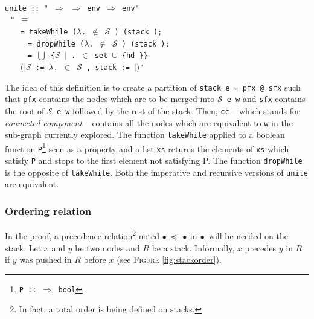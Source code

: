 \documentclass[a4 paper, 12pt]{article}
\newcommand{\where}{{\color{isa_green}{where}}}
\newcommand{\generic}[1]{{\color{isa_purple}{\textquotesingle#1}}}
\newcommand{\isa}[1]{\small\texttt{\\\noindent#1}}
\newcommand{\blue}[1]{{\color{isa_dark_blue}{#1}}}
\newcommand{\bblue}[1]{{\color{isa_blue}{#1}}}
\newcommand{\green}[1]{{\color{isa_dark_green}{#1}}}
\newcommand{\env}[1]{$(\!|$#1$|\!)$}
\theoremstyle{definition}
\begin{document}
\isa{
    \bblue{definition} unite :: "\generic{v} $\Rightarrow$ \generic{v} $\Rightarrow$ \generic{v} env $\Rightarrow$ \generic{v} env" \where{}\\
    $~~~$"\blue{unite} \green{v w e} $\equiv$\\
    $~~~~~~$\bblue{let} \green{pfx} = takeWhile ($\lambda$\green{x}. \green{w} $\notin$ $\mathcal{S}$ \green{e x}) (stack \green{e});\\
    $~~~~~~~~~~$\green{sfx} = dropWhile ($\lambda$\green{x}. \green{w} $\notin$ $\mathcal{S}$ \green{e x}) (stack \green{e});\\
    $~~~~~~~~~~$\green{cc} = $\bigcup$ \{$\mathcal{S}$ \green{e x} $|$ \green{x}. \green{x} $\in$ set \green{pfx} $\cup$ \{hd \green{sfx}\}\}\\
    $~~~~~~$\bblue{in}  \green{e}\env{$\mathcal{S}$ := $\lambda$\green{x}. \bblue{if} \green{x} $\in$ \green{xx} \bblue{then} \green{cc} \bblue{else} $\mathcal{S}$ \green{e x}, stack := \green{sfx}}"
}
    
\BlankLine
\BlankLine

The idea of this definition is to create a partition of \texttt{stack e = pfx @ sfx} such that \texttt{pfx} contains the nodes which are to be merged into \texttt{$\mathcal{S}$ e w} and \texttt{sfx} contains the root of \texttt{$\mathcal{S}$ e w} followed by the rest of the stack. Then, \texttt{cc} -- which stands for \textit{connected component} -- contains all the nodes which are equivalent to \texttt{w} in the sub-graph currently explored. The function \texttt{takeWhile} applied to a boolean function \texttt{P}\footnote{\texttt{P :: \generic{a} $\Rightarrow$ bool}} seen as a property and a list \texttt{xs} returns the elements of \texttt{xs} which satisfy \texttt{P} and stops to the first element not satisfying P. The function \texttt{dropWhile} is the opposite of \texttt{takeWhile}. Both the imperative and recursive versions of \texttt{unite} are equivalent.


\subsubsection{Ordering relation}\label{sec:orderingrelation}
In the proof, a precedence relation\footnote{In fact, a total order is being defined on stacks.} noted {\color{isa_dark_blue}$\bullet~\preceq~\bullet~\text{in}~\bullet$} will be needed on the stack. Let $x$ and $y$ be two nodes and $R$ be a stack. Informally, $x$ precedes $y$ in $R$ if $y$ was pushed in $R$ before $x$ (see \textsc{Figure} \ref{fig:stackorder}).
\end{document}
